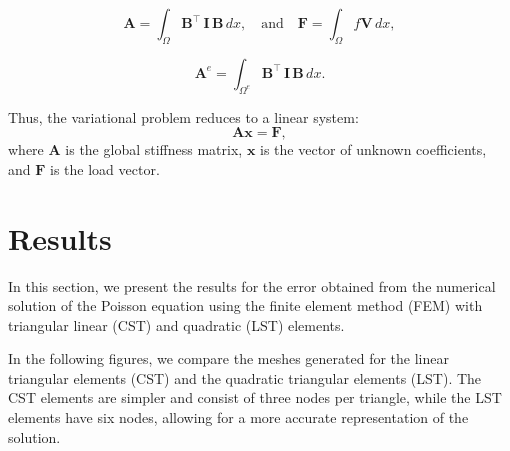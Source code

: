 \documentclass[12pt]{article}
\begin{document}
\begin{equation}
\mathbf{A} = \int_\Omega \mathbf{B}^\top \, \mathbf{I} \, \mathbf{B} \, dx, \quad \text{and} \quad \mathbf{F} = \int_\Omega f \mathbf{V} \, dx,
\end{equation}

\begin{equation}
\mathbf{A}^e = \int_{\Omega^e} \mathbf{B}^\top \, \mathbf{I} \, \mathbf{B} \, dx.
\end{equation}


Thus, the variational problem reduces to a linear system:
\begin{equation}
\mathbf{A} \mathbf{x} = \mathbf{F},
\end{equation}
where \( \mathbf{A} \) is the global stiffness matrix, \( \mathbf{x} \) is the vector of unknown coefficients, and \( \mathbf{F} \) is the load vector.


\newpage
\section{Results}

In this section, we present the results for the error obtained from the numerical solution of the Poisson equation using the finite element method (FEM) with triangular linear (CST) and quadratic (LST) elements.


In the following figures, we compare the meshes generated for the linear triangular elements (CST) and the quadratic triangular elements (LST). The CST elements are simpler and consist of three nodes per triangle, while the LST elements have six nodes, allowing for a more accurate representation of the solution.
\end{document}
